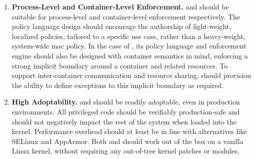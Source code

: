 \begin{enumerate}[font=\bfseries]
  \item \textbf{Process-Level and Container-Level Enforcement.}
    \bpfbox{} and \bpfcontain{} should be suitable for process-level and container-level
    enforcement respectively. The policy language design should encourage the authorship
    of light-weight, localized policies, tailored to a specific use case, rather than
    a heavy-weight, system-wide \gls{mac} policy. In the case of \bpfcontain{}, its policy
    language and enforcement engine should also be designed with container semantics in
    mind, enforcing a strong implicit boundary around a container and related resources.
    To support inter-container communication and resource sharing, \bpfcontain{} should
    provision the ability to define exceptions to this implicit boundary as required.


  \item \textbf{High Adoptability.}
    \bpfbox{} and \bpfcontain{} should be readily adoptable, even in production
    environments. All privileged code should be verifiably production-safe and should not
    negatively impact the rest of the system when loaded into the kernel. Performance
    overhead should at least be in line with alternatives like SELinux and AppArmor.  Both
    \bpfbox{} and \bpfcontain{} should work out of the box on a vanilla Linux kernel,
    without requiring any out-of-tree kernel patches or modules.

\end{enumerate}

